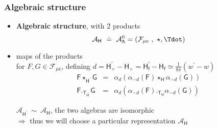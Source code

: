 \documentclass[9pt]{beamer}
\newcommand{\Acal}{\mathcal{A}}
\newcommand{\Fcal}{\mathcal{F}}
\newcommand{\Fsf}{\mathsf{F}}
\newcommand{\Gsf}{\mathsf{G}}
\newcommand{\Hsf}{\mathsf{H}}
\newcommand{\Tsf}{\mathsf{T}}
\newcommand{\csf}{\mathsf{c}}
\newcommand{\fsf}{\mathsf{f}}
\begin{document}
\begin{frame}

\frametitle{Algebraic structure}

\begin{itemize}
 
\item \textbf{Algebraic structure}, with 2 products
\vspace*{-2pt}
\begin{equation*}
\Acal_\Hsf \ \doteq \ \Acal^0_\hbar = \left( \Fcal_{\mu\csf} \ , \ \star , \Tdot \right)
\end{equation*}

\item maps of the products \\
for $F, G \in \Fcal_{\mu\csf}$, defining $d = \Hsf_+^\prime - \Hsf_+ = \Hsf_\fsf^\prime - \Hsf_\fsf \simeq \frac{1}{8\pi}\left( w^\prime - w \right)$
\vspace*{-4pt}
\begin{eqnarray*}
\Fsf \star_{\Hsf^\prime} \Gsf &=& \alpha_d \left( \alpha_{-d}(\Fsf) \star_\Hsf \alpha_{-d}(\Gsf) \right) \\ 
\Fsf ._{\Tsf_{\Hsf^\prime}} \Gsf &=& \alpha_d \left( \alpha_{-d}(\Fsf) ._{\Tsf_\Hsf} \alpha_{-d}(\Gsf) \right) 
\end{eqnarray*}

\vspace*{-9pt}

\begin{block}{}
\vspace*{-14pt}
\begin{center}
$\Acal_{\Hsf^\prime} \ \sim \ \Acal_{\Hsf}$, the two algebras are isomorphic \\
$\Rightarrow$ thus we will choose a particular representation $\Acal_{\Hsf}$
\end{center}
\vspace*{-5pt}
\end{block}

\end{itemize}
  
\end{frame}  

\end{document}
